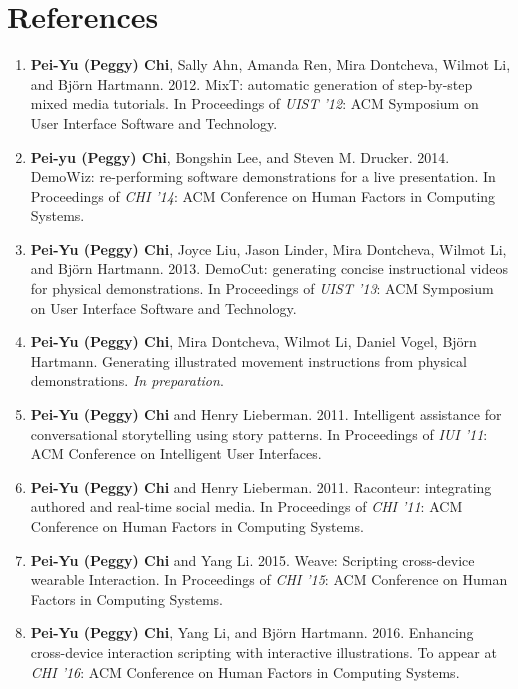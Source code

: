 \vspace{-12pt}
\section{References}

\renewcommand{\labelenumi}{[\theenumi]}

\begin{small} %
\begin{enumerate}[leftmargin=*]
  \itemsep 2pt
  \item \textbf{Pei-Yu (Peggy) Chi}, Sally Ahn, Amanda Ren, Mira Dontcheva, Wilmot Li, and Björn Hartmann. 2012. MixT: automatic generation of step-by-step mixed media tutorials. In Proceedings of \emph{UIST '12}: ACM Symposium on User Interface Software and Technology.
  \item \textbf{Pei-yu (Peggy) Chi}, Bongshin Lee, and Steven M. Drucker. 2014. DemoWiz: re-performing software demonstrations for a live presentation. In Proceedings of \emph{CHI '14}: ACM Conference on Human Factors in Computing Systems.
  \item \textbf{Pei-Yu (Peggy) Chi}, Joyce Liu, Jason Linder, Mira Dontcheva, Wilmot Li, and Björn Hartmann. 2013. DemoCut: generating concise instructional videos for physical demonstrations. In Proceedings of \emph{UIST '13}: ACM Symposium on User Interface Software and Technology.
  \item \textbf{Pei-Yu (Peggy) Chi}, Mira Dontcheva, Wilmot Li, Daniel Vogel, Bj\"orn Hartmann. Generating illustrated movement instructions from physical demonstrations. \emph{In preparation}.
  \item \textbf{Pei-Yu (Peggy) Chi} and Henry Lieberman. 2011. Intelligent assistance for conversational storytelling using story patterns. In Proceedings of \emph{IUI '11}: ACM Conference on Intelligent User Interfaces.
  \item \textbf{Pei-Yu (Peggy) Chi} and Henry Lieberman. 2011. Raconteur: integrating authored and real-time social media. In Proceedings of \emph{CHI '11}: ACM Conference on Human Factors in Computing Systems.
  \item \textbf{Pei-Yu (Peggy) Chi} and Yang Li. 2015. Weave: Scripting cross-device wearable Interaction. In Proceedings of \emph{CHI '15}: ACM Conference on Human Factors in Computing Systems.
  \item \textbf{Pei-Yu (Peggy) Chi}, Yang Li, and Björn Hartmann. 2016. Enhancing cross-device interaction scripting with interactive illustrations. To appear at \emph{CHI '16}: ACM Conference on Human Factors in Computing Systems.
\end{enumerate}
\end{small}
